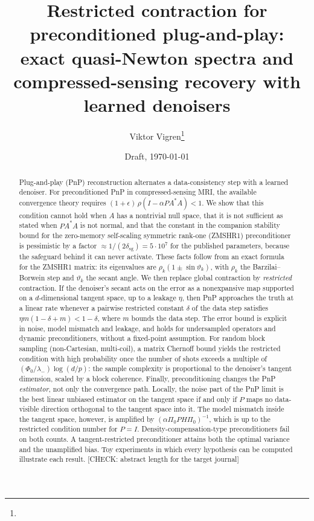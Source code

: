 \documentclass[11pt]{article}
\title{Restricted contraction for preconditioned plug-and-play:\\
exact quasi-Newton spectra and compressed-sensing recovery with learned denoisers}
\author{Viktor Vigren\thanks{\chk{affiliation, WASP, funding acknowledgement, co-authors}}}
\date{Draft, \today}
\theoremstyle{definition}
\theoremstyle{remark}
\newcommand{\dsg}{\delta_{\mathrm{sg}}}
\newcommand{\chk}[1]{\textcolor{red!70!black}{[CHECK: #1]}}
\begin{document}
\maketitle

\begin{abstract}
Plug-and-play (PnP) reconstruction alternates a data-consistency step with a learned denoiser. For
preconditioned PnP in compressed-sensing MRI, the available convergence theory requires
$(1+\epsilon)\,\rho(I-\alpha PA^*A)<1$. We show that this condition cannot hold when $A$ has a nontrivial null
space, that it is not sufficient as stated when $PA^*A$ is not normal, and that the constant in the companion
stability bound for the zero-memory self-scaling symmetric rank-one (ZMSHR1) preconditioner is pessimistic by a
factor $\approx 1/(2\dsg)=5\cdot10^{7}$ for the published parameters, because the safeguard behind it can never
activate. These facts follow from an exact formula for the ZMSHR1 matrix: its eigenvalues are
$\rho_k(1\pm\sin\vartheta_k)$, with $\rho_k$ the Barzilai--Borwein step and $\vartheta_k$ the secant angle.
We then replace global contraction by \emph{restricted} contraction. If the denoiser's secant acts on the error
as a nonexpansive map supported on a $d$-dimensional tangent space, up to a leakage $\eta$, then PnP approaches
the truth at a linear rate whenever a pairwise restricted constant $\delta$ of the data step satisfies
$\eta m(1-\delta+m)<1-\delta$, where $m$ bounds the data step. The error bound is explicit in noise, model mismatch
and leakage, and holds for undersampled operators and dynamic preconditioners, without a fixed-point
assumption. For random block sampling (non-Cartesian, multi-coil), a matrix Chernoff bound yields the
restricted condition with high probability once the number of shots exceeds a multiple of
$(\Phi_0/\lambda_-)\log(d/p)$: the sample complexity is proportional to the denoiser's tangent dimension, scaled
by a block coherence. Finally, preconditioning changes the PnP \emph{estimator}, not only the convergence path.
Locally, the noise part of the PnP limit is the best linear unbiased estimator on the tangent space if and only if
$P$ maps no data-visible direction orthogonal to the tangent space into it. The model mismatch inside the tangent
space, however, is amplified by $(\alpha\Pi_0PH\Pi_0)^{-1}$, which is up to the restricted condition number for
$P=I$. Density-compensation-type preconditioners fail on both counts. A tangent-restricted preconditioner attains
both the optimal variance and the unamplified bias. Toy experiments in which every hypothesis can be computed
illustrate each result. \chk{abstract length for the target journal}
\end{abstract}
\end{document}
